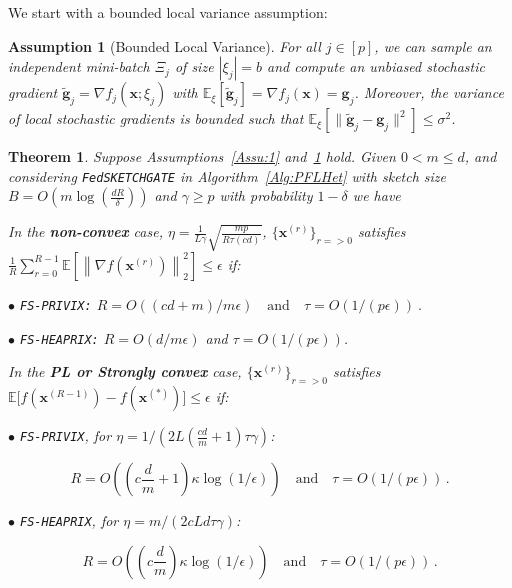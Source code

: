 \documentclass[sigconf, anonymous, review]{acmart}
\newtheorem{theorem}{Theorem}
\newtheorem{assumption}{Assumption}
\begin{document}
We start with a bounded local variance assumption:
\begin{assumption}[Bounded Local Variance]\label{Assu:2}
For all $j\in [p]$, we can sample an independent mini-batch $\Xi_j$ of size $|{\xi}_j| = b$ and compute an unbiased stochastic gradient $\tilde{\mathbf{g}}_j = \nabla f_j(\boldsymbol{x}; \xi_j)$ with $\mathbb{E}_{\xi}[\tilde{\mathbf{g}}_j] = \nabla f_{j}(\boldsymbol{x})={\mathbf{g}}_j$. 
Moreover, the variance of local stochastic gradients is bounded such that $
\mathbb{E}_{\xi}\left[\|\tilde{\mathbf{g}}_j-{\mathbf{g}}_j\|^2\right]\leq \sigma^2$.
\end{assumption}
\begin{theorem}\label{thm:hetreg_case}
Suppose Assumptions~\ref{Assu:1} and~\ref{Assu:2} hold. Given $0<m\leq d$, and considering \texttt{FedSKETCHGATE} in Algorithm~\ref{Alg:PFLHet} with sketch size $B=O\left(m\log\left(\frac{d R}{\delta}\right)\right)$ and $\gamma\geq p$ with probability $1-\delta$ we have  



In the \textbf{non-convex} case, $\eta=\frac{1}{L\gamma}\sqrt{\frac{mp}{R\tau\left(cd\right)}}$, $\{ {\boldsymbol{x}}^{(r)}\}_{r=>0}$ satisfies  $\frac{1}{R}\sum_{r=0}^{R-1}\mathbb{E}\left[\left\|\nabla f({\boldsymbol{x}}^{(r)})\right\|_2^2\right]\leq {\epsilon}$ if: 
 
\noindent $\bullet$ \texttt{FS-PRIVIX:}    
$R=O((cd+m)/m\epsilon) \quad \textrm{and} \quad \tau=O(1/(p\epsilon))\ .$

\noindent $\bullet$ \texttt{FS-HEAPRIX:} $R=O(d/m\epsilon)$ and $\tau=O(1/(p\epsilon))$.

In the \textbf{PL or Strongly convex} case, $\{ {\boldsymbol{x}}^{(r)}\}_{r=>0}$ satisfies $\mathbb{E}\Big[f({\boldsymbol{x}}^{(R-1)})-f({\boldsymbol{x}}^{(*)})\Big]\leq \epsilon$ if: 

\noindent $\bullet$ \texttt{FS-PRIVIX}, for $\eta=1/(2L(\frac{cd}{m}+1)\tau\gamma)$: 

$$R=O\left((c\frac{d}{m}+1)\kappa \log(1/\epsilon)\right) \quad \textrm{and} \quad \tau=O\left(1/(p\epsilon)\right)\, .$$

\noindent $\bullet$ \texttt{FS-HEAPRIX}, for $\eta=m/(2cLd\tau\gamma)$: 

$$R=O\left((c\frac{d}{m})\kappa \log(1/\epsilon)\right)\quad \textrm{and} \quad \tau=O\left(1/(p\epsilon)\right)\, .$$


\end{theorem}
\end{document}
